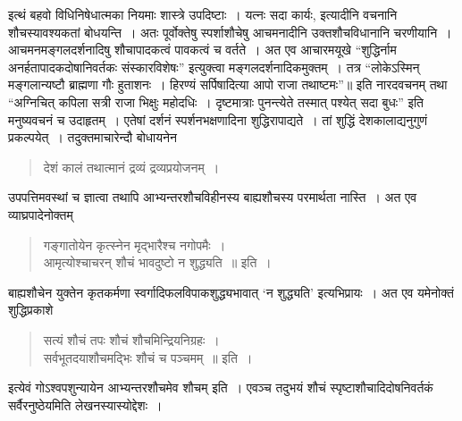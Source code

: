 {इत्थं बहवो विधिनिषेधात्मका नियमाः शास्त्रे उपदिष्टाः~। यत्नः सदा कार्यः, इत्यादीनि वचनानि शौचस्यावश्यकतां बोधयन्ति~। अतः पूर्वोक्तेषु स्पर्शाशौचेषु आचमनादीनि उक्तशौचविधानानि चरणीयानि~। आचमनमङ्गलदर्शनादिषु शौचापादकत्वं पावकत्वं च वर्तते~। अत एव आचारमयूखे “शुद्धिर्नाम अनर्हतापादकदोषानिवर्तकः संस्कारविशेषः” इत्युक्त्वा मङ्गलदर्शनादिकमुक्तम्~। तत्र “लोकेऽस्मिन् मङ्गलान्यष्टौ ब्राह्मणा गौः हुताशनः~। हिरण्यं सर्पिषादित्या आपो राजा तथाष्टमः”॥ इति नारदवचनम् तथा “अग्निचित् कपिला सत्री राजा भिक्षुः महोदधिः~। दृष्टमात्राः पुनन्त्येते तस्मात् पश्येत् सदा बुधः” इति मनुष्यवचनं च उदाहृतम्~। एतेषां दर्शनं स्पर्शनभक्षणादिना शुद्धिरापाद्यते~। तां शुद्धिं देशकालाद्यनुगुणं प्रकल्पयेत्~। तदुक्तमाचारेन्दौ बोधायनेन  \enginline{-}
\begin{verse}
देशं कालं तथात्मानं द्रव्यं द्रव्यप्रयोजनम्~। 
\end{verse}
उपपत्तिमवस्थां च ज्ञात्वा तथापि आभ्यन्तरशौचविहीनस्य बाह्यशौचस्य परमार्थता नास्ति~। अत एव व्याघ्रपादेनोक्तम्  \enginline{-}
\begin{verse}
गङ्गातोयेन कृत्स्नेन मृद्भारैश्च नगोपमैः~। \\
आमृत्योश्चाचरन् शौचं भावदुष्टो न शुद्ध्यति~॥ इति~। 
\end{verse}
बाह्यशौचेन युक्तेन कृतकर्मणा स्वर्गादिफलविपाकशुद्ध्यभावात् ‘न शुद्ध्यति’ इत्यभिप्रायः~। अत एव यमेनोक्तं शुद्धिप्रकाशे \enginline{-}
\begin{verse}
सत्यं शौचं तपः शौचं शौचमिन्द्रियनिग्रहः~। \\
सर्वभूतदयाशौचमद्भिः शौचं च पञ्चमम्~॥ इति~। 
\end{verse}
इत्येवं गोऽश्वपशुन्यायेन आभ्यन्तरशौचमेव शौचम् इति~। एवञ्च तदुभयं शौचं स्पृष्टाशौचादिदोषनिवर्तकं सर्वैरनुष्ठेयमिति लेखनस्यास्योद्देशः~। 

\articleend
}
